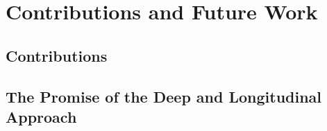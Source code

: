 \chapter{Contributions and Future Work}
\label{ch:conclusion}

\section{Contributions}

\section{The Promise of the Deep and Longitudinal Approach}
